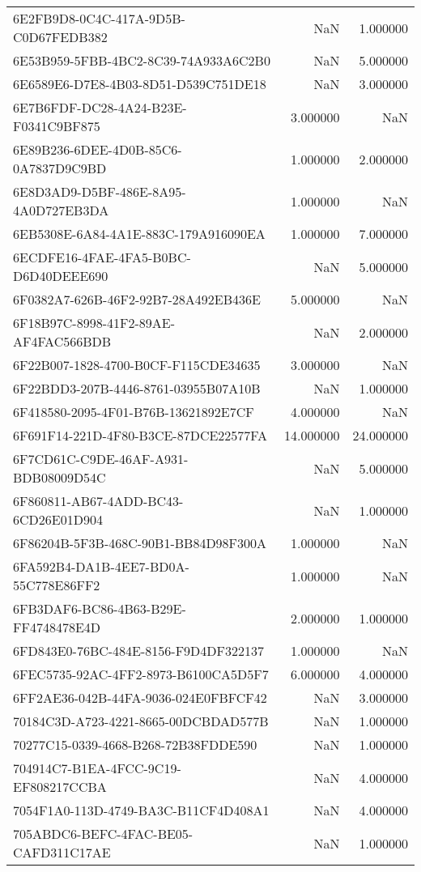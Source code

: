 \begin{tabular}{lrr}
6E2FB9D8-0C4C-417A-9D5B-C0D67FEDB382 & NaN & 1.000000 \\
6E53B959-5FBB-4BC2-8C39-74A933A6C2B0 & NaN & 5.000000 \\
6E6589E6-D7E8-4B03-8D51-D539C751DE18 & NaN & 3.000000 \\
6E7B6FDF-DC28-4A24-B23E-F0341C9BF875 & 3.000000 & NaN \\
6E89B236-6DEE-4D0B-85C6-0A7837D9C9BD & 1.000000 & 2.000000 \\
6E8D3AD9-D5BF-486E-8A95-4A0D727EB3DA & 1.000000 & NaN \\
6EB5308E-6A84-4A1E-883C-179A916090EA & 1.000000 & 7.000000 \\
6ECDFE16-4FAE-4FA5-B0BC-D6D40DEEE690 & NaN & 5.000000 \\
6F0382A7-626B-46F2-92B7-28A492EB436E & 5.000000 & NaN \\
6F18B97C-8998-41F2-89AE-AF4FAC566BDB & NaN & 2.000000 \\
6F22B007-1828-4700-B0CF-F115CDE34635 & 3.000000 & NaN \\
6F22BDD3-207B-4446-8761-03955B07A10B & NaN & 1.000000 \\
6F418580-2095-4F01-B76B-13621892E7CF & 4.000000 & NaN \\
6F691F14-221D-4F80-B3CE-87DCE22577FA & 14.000000 & 24.000000 \\
6F7CD61C-C9DE-46AF-A931-BDB08009D54C & NaN & 5.000000 \\
6F860811-AB67-4ADD-BC43-6CD26E01D904 & NaN & 1.000000 \\
6F86204B-5F3B-468C-90B1-BB84D98F300A & 1.000000 & NaN \\
6FA592B4-DA1B-4EE7-BD0A-55C778E86FF2 & 1.000000 & NaN \\
6FB3DAF6-BC86-4B63-B29E-FF4748478E4D & 2.000000 & 1.000000 \\
6FD843E0-76BC-484E-8156-F9D4DF322137 & 1.000000 & NaN \\
6FEC5735-92AC-4FF2-8973-B6100CA5D5F7 & 6.000000 & 4.000000 \\
6FF2AE36-042B-44FA-9036-024E0FBFCF42 & NaN & 3.000000 \\
70184C3D-A723-4221-8665-00DCBDAD577B & NaN & 1.000000 \\
70277C15-0339-4668-B268-72B38FDDE590 & NaN & 1.000000 \\
704914C7-B1EA-4FCC-9C19-EF808217CCBA & NaN & 4.000000 \\
7054F1A0-113D-4749-BA3C-B11CF4D408A1 & NaN & 4.000000 \\
705ABDC6-BEFC-4FAC-BE05-CAFD311C17AE & NaN & 1.000000 \\

\end{tabular}
